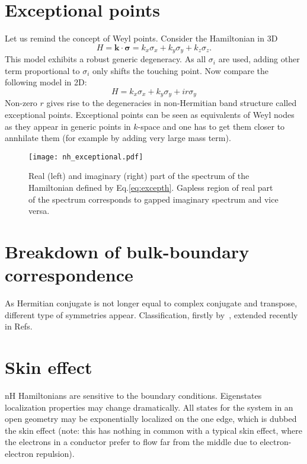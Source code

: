 \section{Exceptional points}
Let us remind the concept of Weyl points. Consider the Hamiltonian in 3D
\begin{equation}
H =\mathbf{k} \cdot \boldsymbol{\sigma} = k_x \sigma_x + k_y \sigma_y + k_z \sigma_z.
\label{eq:weylh}
\end{equation}
This model exhibits a robust generic degeneracy. As all $\sigma_i$ are used, adding other term proportional to $\sigma_i$ only shifts the touching point. Now compare the following model in 2D:
\begin{equation}
H = k_x \sigma_x + k_y \sigma_y + i r \sigma_y
\label{eq:excepth}
\end{equation}
Non-zero $r$ gives rise to  the degeneracies in non-Hermitian band structure called exceptional points. Exceptional points can be seen as equivalents of Weyl nodes as they appear in generic points in $k$-space and one has to get them closer to annhilate them (for example by adding very large mass term).

\begin{figure}
\centering
\texttt{[image: nh\_exceptional.pdf]}
\caption{Real (left) and imaginary (right) part of the spectrum of the Hamiltonian defined by Eq.\eqref{eq:excepth}. Gapless region of real part of the spectrum corresponds to gapped imaginary spectrum and vice versa.}
\label{fig:excepth}
\end{figure}



\section{Breakdown of bulk-boundary correspondence}


As Hermitian conjugate is not longer equal to complex conjugate and transpose, different type of symmetries appear. Classification, firstly by~\cite{Bernard_2002}, extended recently in Refs.~\cite{PhysRevLett.120.146402, PhysRevX.8.031079, PhysRevB.99.125103}



\section{Skin effect}
nH Hamiltonians are sensitive to the boundary conditions. Eigenstates localization properties may change dramatically. All states for the system in an open geometry may be exponentially localized on the one edge, which is dubbed the skin effect (note: this has nothing in common with a typical skin effect, where the electrons in a conductor prefer to flow far from the middle due to electron-electron repulsion).

